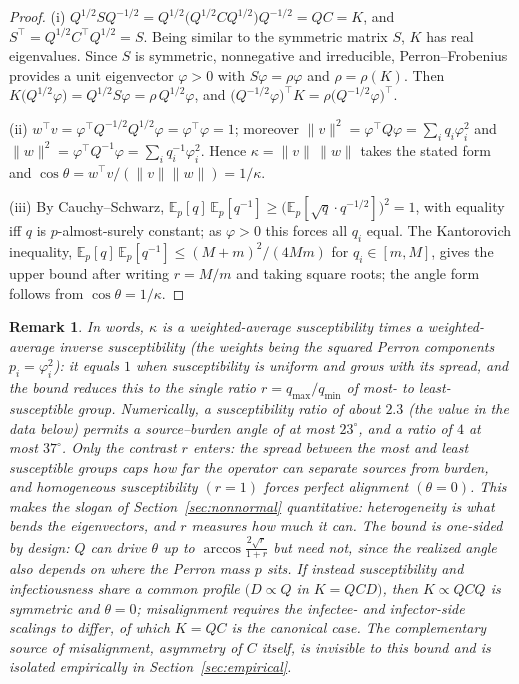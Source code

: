 \documentclass[12pt]{article}
\newtheorem{remark}{Remark}[section]
\begin{document}
\begin{proof}
\textup{(i)} $Q^{1/2}SQ^{-1/2}=Q^{1/2}\bigl(Q^{1/2}CQ^{1/2}\bigr)Q^{-1/2}=QC=K$, and $S^{\top}=Q^{1/2}C^{\top}Q^{1/2}=S$. Being similar to the symmetric matrix $S$, $K$ has real eigenvalues. Since $S$ is symmetric, nonnegative and irreducible, Perron--Frobenius provides a unit eigenvector $\varphi>0$ with $S\varphi=\rho\varphi$ and $\rho=\rho(K)$. Then $K\bigl(Q^{1/2}\varphi\bigr)=Q^{1/2}S\varphi=\rho\,Q^{1/2}\varphi$, and $\bigl(Q^{-1/2}\varphi\bigr)^{\top}K=\rho\bigl(Q^{-1/2}\varphi\bigr)^{\top}$.

\textup{(ii)} $w^{\top}v=\varphi^{\top}Q^{-1/2}Q^{1/2}\varphi=\varphi^{\top}\varphi=1$; moreover $\lVert v\rVert^{2}=\varphi^{\top}Q\varphi=\sum_i q_i\varphi_i^{2}$ and $\lVert w\rVert^{2}=\varphi^{\top}Q^{-1}\varphi=\sum_i q_i^{-1}\varphi_i^{2}$. Hence $\kappa=\lVert v\rVert\,\lVert w\rVert$ takes the stated form and $\cos\theta=w^{\top}v/(\lVert v\rVert\lVert w\rVert)=1/\kappa$.

\textup{(iii)} By Cauchy--Schwarz, $\mathbb{E}_p[q]\,\mathbb{E}_p[q^{-1}]\ge\bigl(\mathbb{E}_p[\sqrt q\cdot q^{-1/2}]\bigr)^{2}=1$, with equality iff $q$ is $p$-almost-surely constant; as $\varphi>0$ this forces all $q_i$ equal. The Kantorovich inequality, $\mathbb{E}_p[q]\,\mathbb{E}_p[q^{-1}]\le (M+m)^{2}/(4Mm)$ for $q_i\in[m,M]$, gives the upper bound after writing $r=M/m$ and taking square roots; the angle form follows from $\cos\theta=1/\kappa$.
\end{proof}

\begin{remark}
In words, $\kappa$ is a weighted-average susceptibility times a weighted-average \emph{inverse} susceptibility (the weights being the squared Perron components $p_i=\varphi_i^2$): it equals $1$ when susceptibility is uniform and grows with its spread, and the bound reduces this to the single ratio $r=q_{\max}/q_{\min}$ of most- to least-susceptible group. Numerically, a susceptibility ratio of about $2.3$ (the value in the data below) permits a source--burden angle of at most $23^{\circ}$, and a ratio of $4$ at most $37^{\circ}$. Only the \emph{contrast} $r$ enters: the spread between the most and least susceptible groups caps how far the operator can separate sources from burden, and homogeneous susceptibility $(r=1)$ forces perfect alignment $(\theta=0)$. This makes the slogan of Section~\ref{sec:nonnormal} quantitative: heterogeneity is what bends the eigenvectors, and $r$ measures how much it can. The bound is one-sided by design: $Q$ \emph{can} drive $\theta$ up to $\arccos\frac{2\sqrt r}{1+r}$ but need not, since the realized angle also depends on where the Perron mass $p$ sits. If instead susceptibility and infectiousness share a common profile $(D\propto Q$ in $K=QCD)$, then $K\propto QCQ$ is symmetric and $\theta=0$; misalignment requires the infectee- and infector-side scalings to differ, of which $K=QC$ is the canonical case. The complementary source of misalignment, asymmetry of $C$ itself, is invisible to this bound and is isolated empirically in Section~\ref{sec:empirical}.
\end{remark}
\end{document}
